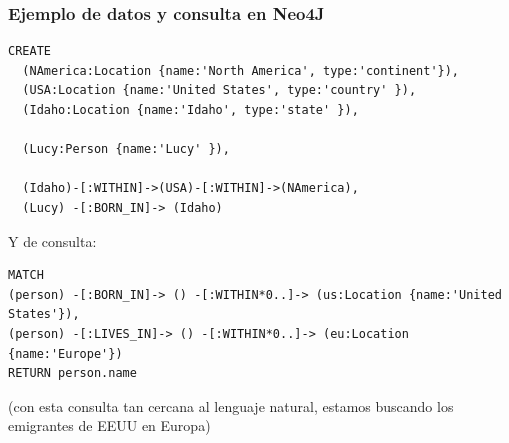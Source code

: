 \documentclass[14pt]{beamer}
\begin{document}



\begin{frame}
  \frametitle{Ejemplo de datos y consulta en Neo4J}
\begin{block}{}
\begin{lstlisting}
CREATE
  (NAmerica:Location {name:'North America', type:'continent'}),
  (USA:Location {name:'United States', type:'country' }),
  (Idaho:Location {name:'Idaho', type:'state' }),

  (Lucy:Person {name:'Lucy' }),

  (Idaho)-[:WITHIN]->(USA)-[:WITHIN]->(NAmerica),
  (Lucy) -[:BORN_IN]-> (Idaho)
\end{lstlisting}
\end{block}

\framebreak

Y de consulta:
\begin{block}{}
\begin{lstlisting}
MATCH
(person) -[:BORN_IN]-> () -[:WITHIN*0..]-> (us:Location {name:'United States'}),
(person) -[:LIVES_IN]-> () -[:WITHIN*0..]-> (eu:Location {name:'Europe'})
RETURN person.name
\end{lstlisting}
\end{block}

(con esta consulta tan cercana al lenguaje natural, estamos buscando los
emigrantes de EEUU en Europa)

\end{frame}
\end{document}
